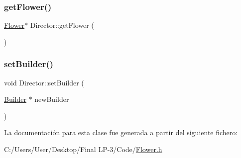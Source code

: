 \mbox{\label{class_director_a0db8afee3630637eee63370a9de4dc3a}} 
\subsubsection{\texorpdfstring{getFlower()}{getFlower()}}
{\footnotesize\ttfamily \mbox{\hyperlink{class_flower}{Flower}}$\ast$ Director\+::get\+Flower (\begin{DoxyParamCaption}{ }\end{DoxyParamCaption})\hspace{0.3cm}{\ttfamily [inline]}}

\mbox{\label{class_director_aa266ee3382d3bb30df71951ba0976ae4}} 
\subsubsection{\texorpdfstring{setBuilder()}{setBuilder()}}
{\footnotesize\ttfamily void Director\+::set\+Builder (\begin{DoxyParamCaption}\item[{\mbox{\hyperlink{class_builder}{Builder}} $\ast$}]{new\+Builder }\end{DoxyParamCaption})\hspace{0.3cm}{\ttfamily [inline]}}



La documentación para esta clase fue generada a partir del siguiente fichero\+:\begin{DoxyCompactItemize}
\item 
C\+:/\+Users/\+User/\+Desktop/\+Final L\+P-\/3/\+Code/\mbox{\hyperlink{_flower_8h}{Flower.\+h}}\end{DoxyCompactItemize}
